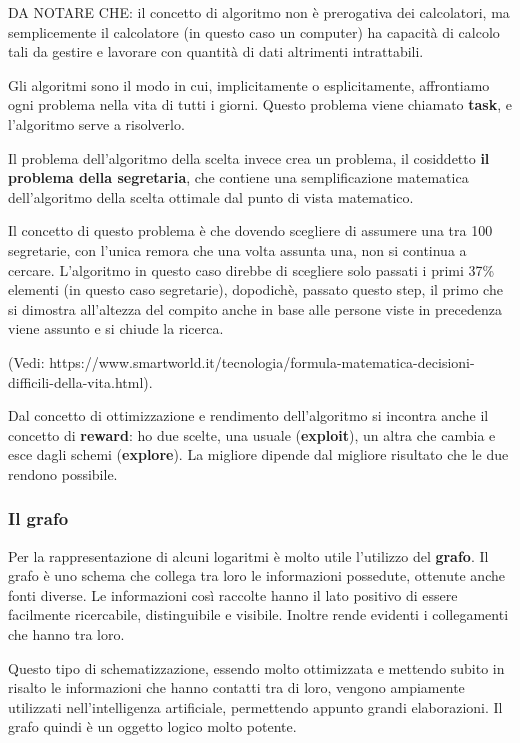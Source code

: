 \documentclass[
  paper=a4,
  oneside  ,captions=tableheading
]{scrbook}
\begin{document}
DA NOTARE CHE: il concetto di algoritmo non è prerogativa dei
calcolatori, ma semplicemente il calcolatore (in questo caso un
computer) ha capacità di calcolo tali da gestire e lavorare con quantità
di dati altrimenti intrattabili.

Gli algoritmi sono il modo in cui, implicitamente o esplicitamente,
affrontiamo ogni problema nella vita di tutti i giorni. Questo problema
viene chiamato \textbf{task}, e l'algoritmo serve a risolverlo.

Il problema dell'algoritmo della scelta invece crea un problema, il
cosiddetto \textbf{il problema della segretaria}, che contiene una
semplificazione matematica dell'algoritmo della scelta ottimale dal
punto di vista matematico.

Il concetto di questo problema è che dovendo scegliere di assumere una
tra 100 segretarie, con l'unica remora che una volta assunta una, non si
continua a cercare. L'algoritmo in questo caso direbbe di scegliere solo
passati i primi 37\% elementi (in questo caso segretarie), dopodichè,
passato questo step, il primo che si dimostra all'altezza del compito
anche in base alle persone viste in precedenza viene assunto e si chiude
la ricerca.

(Vedi:
https://www.smartworld.it/tecnologia/formula-matematica-decisioni-difficili-della-vita.html).

Dal concetto di ottimizzazione e rendimento dell'algoritmo si incontra
anche il concetto di \textbf{reward}: ho due scelte, una usuale
(\textbf{exploit}), un altra che cambia e esce dagli schemi
(\textbf{explore}). La migliore dipende dal migliore risultato che le
due rendono possibile.

\hypertarget{il-grafo}{%
\subsubsection{Il grafo}\label{il-grafo}}

Per la rappresentazione di alcuni logaritmi è molto utile l'utilizzo del
\textbf{grafo}. Il grafo è uno schema che collega tra loro le
informazioni possedute, ottenute anche fonti diverse. Le informazioni
così raccolte hanno il lato positivo di essere facilmente ricercabile,
distinguibile e visibile. Inoltre rende evidenti i collegamenti che
hanno tra loro.

Questo tipo di schematizzazione, essendo molto ottimizzata e mettendo
subito in risalto le informazioni che hanno contatti tra di loro,
vengono ampiamente utilizzati nell'intelligenza artificiale, permettendo
appunto grandi elaborazioni. Il grafo quindi è un oggetto logico molto
potente.
\end{document}
